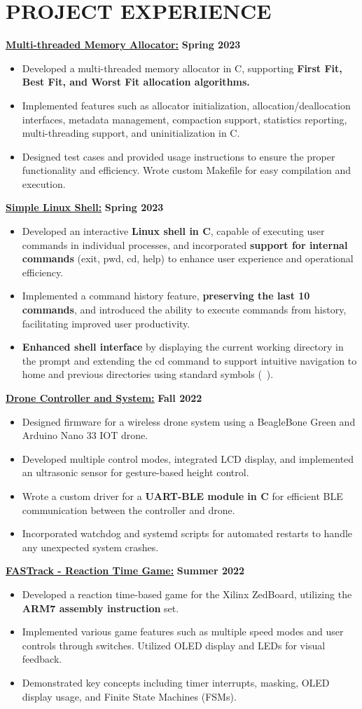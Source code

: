 \documentclass[letterpaper,11pt]{article}
\newcommand{\Item} [1] {
    \item\small{{#1 \vspace{-2pt}}}
}
\newcommand{\resumeItemListStart} [0] {
    \vspace{2pt}
    \begin{itemize}[topsep=0pt,itemsep=-2pt]
}
\newcommand{\resumeItemListEnd} [0] {
    \end{itemize}
    \vspace{5pt}
}
\begin{document}
    \section{PROJECT EXPERIENCE}
    \href{https://github.com/SatireSage/Multi-threaded-Memory-Allocator}{{\color{colorValue}} \underline{\textbf{Multi-threaded Memory Allocator:}}} \hfill \textbf{Spring 2023}
    \resumeItemListStart{}
        \Item{Developed a multi-threaded memory allocator in C, supporting \textbf{First Fit, Best Fit, and Worst Fit allocation algorithms.}}
        \Item{Implemented features such as allocator initialization, allocation/deallocation interfaces, metadata management, compaction support, statistics reporting, multi-threading support, and uninitialization in C.}
        \Item{Designed test cases and provided usage instructions to ensure the proper functionality and efficiency. Wrote custom Makefile for easy compilation and execution.}
    \resumeItemListEnd{}
    \href{https://github.com/SatireSage/Simple-Linux-Shell}{{\color{colorValue}} \underline{\textbf{Simple Linux Shell:}}} \hfill \textbf{Spring 2023}
    \resumeItemListStart{}
        \Item{Developed an interactive \textbf{Linux shell in C}, capable of executing user commands in individual processes, and incorporated \textbf{support for internal commands} (exit, pwd, cd, help) to enhance user experience and operational efficiency.}
        \Item{Implemented a command history feature, \textbf{preserving the last 10 commands}, and introduced the ability to execute commands from history, facilitating improved user productivity.}
        \Item{\textbf{Enhanced shell interface} by displaying the current working directory in the prompt and extending the cd command to support intuitive navigation to home and previous directories using standard symbols (~).}
    \resumeItemListEnd{}
    \href{https://github.com/SatireSage/Dronee}{{\color{colorValue}} \underline{\textbf{Drone Controller and System:}}} \hfill \textbf{Fall 2022}
    \resumeItemListStart{}
        \Item{Designed firmware for a wireless drone system using a BeagleBone Green and Arduino Nano 33 IOT drone.}
        \Item{Developed multiple control modes, integrated LCD display, and implemented an ultrasonic sensor for gesture-based height control.}
        \Item{Wrote a custom driver for a \textbf{UART-BLE module in C} for efficient BLE communication between the controller and drone.}
        \Item{Incorporated watchdog and systemd scripts for automated restarts to handle any unexpected system crashes.}
    \resumeItemListEnd{}
    \href{https://github.com/SatireSage/FASTrack}{{\color{colorValue}} \underline{\textbf{FASTrack - Reaction Time Game:}}} \hfill \textbf{Summer 2022}
    \resumeItemListStart{}
        \Item{Developed a reaction time-based game for the Xilinx ZedBoard, utilizing the \textbf{ARM7 assembly instruction} set.}
        \Item{Implemented various game features such as multiple speed modes and user controls through switches. Utilized OLED display and LEDs for visual feedback.}
        \Item{Demonstrated key concepts including timer interrupts, masking, OLED display usage, and Finite State Machines (FSMs).}
    \resumeItemListEnd{}
\end{document}
